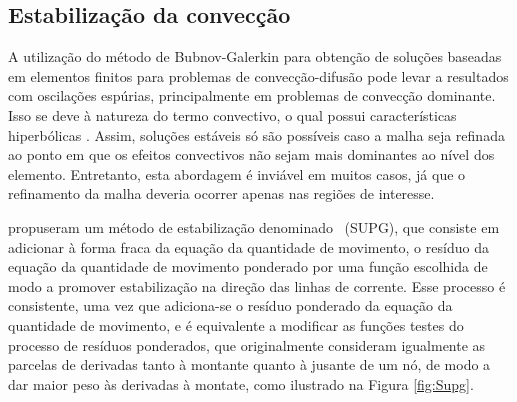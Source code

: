 %

\subsection{Estabilização da convecção}

A utilização do método de Bubnov-Galerkin para obtenção de soluções baseadas em elementos finitos para problemas de convecção-difusão pode levar a resultados com oscilações espúrias, principalmente em problemas de convecção dominante. Isso se deve à natureza do termo convectivo, o qual possui características hiperbólicas \cite{brooks1982streamline,john2006computational,shilt2021stabilization}. Assim, soluções estáveis só são possíveis caso a malha seja refinada ao ponto em que os efeitos convectivos não sejam mais dominantes ao nível dos elemento. Entretanto, esta abordagem é inviável em muitos casos, já que o refinamento da malha deveria ocorrer apenas nas regiões de interesse.

 propuseram um método de estabilização denominado \SUPG\ (SUPG), que consiste em adicionar à forma fraca da equação da quantidade de movimento, o resíduo da equação da quantidade de movimento ponderado por uma função escolhida de modo a promover estabilização na direção das linhas de corrente. Esse processo é consistente, uma vez que adiciona-se o resíduo ponderado da equação da quantidade de movimento, e é equivalente a modificar as funções testes do processo de resíduos ponderados, que originalmente consideram igualmente as parcelas de derivadas tanto à montante quanto à jusante de um nó, de modo a dar maior peso às derivadas à montate, como ilustrado na Figura \ref{fig:Supg}.

